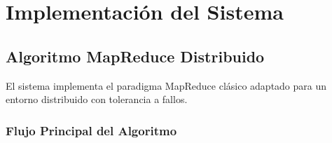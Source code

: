 \section{Implementación del Sistema}

\subsection{Algoritmo MapReduce Distribuido}

El sistema implementa el paradigma MapReduce clásico adaptado para un entorno distribuido con tolerancia a fallos.

\subsubsection{Flujo Principal del Algoritmo}

